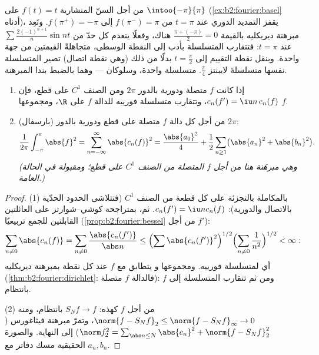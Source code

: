 \begin{example}\label{ex:b2:fourier:jumpvalue}
من أجل السنّ المنشارية $f(t) = t$ على $\intoo{-\pi}{\pi}$
(\cref{ex:b2:fourier:basel} أدناه)، يقفز التمديد الدوري
عند $t = \pi$ من $f(\pi^-) = \pi$ إلى $f(\pi^+) = -\pi$.
وتَعِد مبرهنة ديريكليه بالقيمة $\frac{\pi + (-\pi)}{2} = 0$
هناك، وفعلًا ينعدم كل حدّ من $\sum
\frac{2(-1)^{n+1}}{n}\sin nt$ عند $t = \pi$: فتتقارب
المتسلسلة بأدب إلى النقطة الوسطى، متجاهلةً القيمتين
من جهة واحدة. وبنقل نقطة التقييم إلى $t =
\frac\pi2$ بدلًا من ذلك (وهي نقطة اتصال) تصير المتسلسلة نفسها
متسلسلةَ لايبنتز $\frac\pi4$. متسلسلة واحدة، وسلوكان ---
وهما بالضبط بندا المبرهنة.
\end{example}

\begin{theorem}\label{thm:b2:fourier:parseval}
\begin{enumerate}
  \item إذا كانت $f$ متصلة ودورية بالدور $2\pi$ ومن الصنف $C^1$ على قطع،
        فإن $c_n(f') = \iu n\,c_n(f)$، وتتقارب متسلسلة فورييه للدالة $f$
        \emph{} على $\R$، ومجموعها $f$.
  \item (بارسفال) من أجل كل دالة $f$ متصلة على قطع ودورية بالدور $2\pi$:
        \[
        \frac{1}{2\pi}\int_{-\pi}^{\pi}\abs{f}^2
        = \sum_{n=-\infty}^{\infty} \abs{c_n(f)}^2
        = \frac{\abs{a_0}^2}{4} + \frac12\sum_{n\geq1}
        \bigl(\abs{a_n}^2 + \abs{b_n}^2\bigr).
        \]
        \emph{(وهي مبرهَنة هنا من أجل $f$ المتصلة من الصنف $C^1$ على قطع؛
        ومقبولة في الحالة العامة.)}
\end{enumerate}
\end{theorem}

\begin{proof}
(1) بالمكاملة بالتجزئة على كل قطعة من الصنف $C^1$ (فتتلاشى الحدود الحدّية
بالاتصال والدورية): $c_n(f') = \iu n c_n(f)$. ثم، بمتراجحة
كوشي--شوارتز على العائلتين القابلتين للجمع تربيعيًا
(\cref{prop:b2:fourier:bessel} من أجل $f'$):
\[
\sum_{n \neq 0} \abs{c_n(f)} = \sum_{n\neq0}
\frac{\abs{c_n(f')}}{\abs n}
\leq \Bigl(\sum \abs{c_n(f')}^2\Bigr)^{1/2}
\Bigl(\sum_{n\neq0}\frac{1}{n^2}\Bigr)^{1/2} < \infty :
\]
أي  لمتسلسلة فورييه. ومجموعها  و
يتطابق مع $f$ عند كل نقطة بمبرهنة ديريكليه
(\cref{thm:b2:fourier:dirichlet}: فالدالة $f$ متصلة): ومن ثم تتقارب المتسلسلة
إلى $f$ بانتظام.

(2) من أجل $f$ كهذه: $S_N f \to f$ بانتظام، ومنه $\norm{f - S_Nf}_2
\leq \norm{f - S_Nf}_\infty \to 0$، وتمرّ مبرهنة فيثاغورس
($\norm f_2^2 = \sum_{\abs n \leq N}\abs{c_n}^2 + \norm{f -
S_Nf}_2^2$) إلى النهاية. والصورة الحقيقية مسك دفاتر مع
$a_n, b_n$.
\end{proof}

